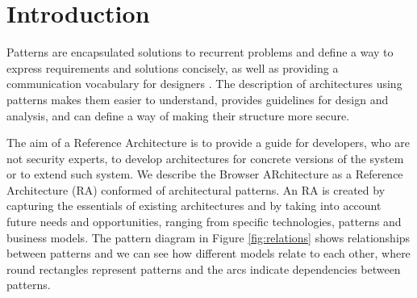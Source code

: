 \documentclass[prodmode,acmtecs]{acmsmall}
\begin{document}
%
%






\maketitle
\section{Introduction}
Patterns are encapsulated solutions to recurrent problems and define a way to express requirements and solutions concisely, as well as providing a communication vocabulary for designers \cite{gamma1994design,buschman1996system}. The description of architectures using patterns makes them easier to understand, provides guidelines for design and analysis, and can define a way of making their structure more secure.

The aim of a Reference Architecture is to provide a guide for developers, who are not security experts, to develop architectures for concrete versions of the system or to extend such system. We describe the Browser ARchitecture as a Reference Architecture (RA) conformed of architectural patterns. An RA is created by capturing the essentials of existing architectures and by taking into account future needs and opportunities, ranging from specific technologies, patterns and business models. The pattern diagram \cite{buschman1996system} in Figure \ref{fig:relations} shows relationships between patterns and we can see how different models relate to each other, where round rectangles represent patterns and the arcs indicate dependencies between patterns. 
\end{document}
